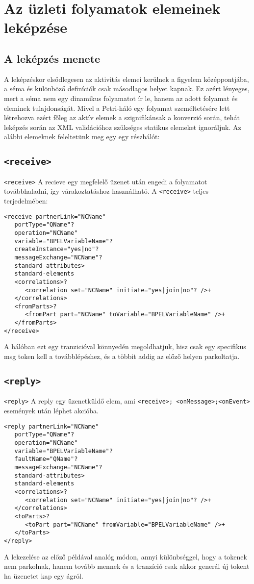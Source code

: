 \chapter{Az üzleti folyamatok elemeinek leképzése}


\section{A leképzés menete}
A leképzéskor elsődlegesen az aktivitás elemei kerülnek a figyelem középpontjába, a séma és különböző definíciók csak másodlagos helyet kapnak. Ez azért lényeges, mert a séma nem egy dinamikus folyamatot ír le, hanem az adott folyamat és eleminek tulajdonságát. Mivel a Petri-háló egy folyamat személtetésére lett létrehozva ezért főleg az aktív elemek a szignifikánsak a konverzió során, tehát leképzés során az XML validációhoz szükséges statikus elemeket ignoráljuk.  Az alábbi elemeknek feleltetünk meg egy egy részhálót:
\section{\texttt{<receive>}}
\texttt{<receive>} A recieve egy megfelelő üzenet után engedi a folyamatot továbbhaladni, így várakoztatáshoz használható. A \texttt{<receive>} teljes terjedelmében:\\
\begin{verbatim}
<receive partnerLink="NCName"
   portType="QName"?
   operation="NCName"
   variable="BPELVariableName"?
   createInstance="yes|no"?
   messageExchange="NCName"?
   standard-attributes>
   standard-elements
   <correlations>?
      <correlation set="NCName" initiate="yes|join|no"? />+
   </correlations>
   <fromParts>?
      <fromPart part="NCName" toVariable="BPELVariableName" />+
   </fromParts>
</receive>
\end{verbatim}
A hálóban ezt egy tranzicióval könnyedén megoldhatjuk, hisz csak egy specifikus msg token kell a továbblépéshez, és a többit addig az előző helyen parkoltatja. 

\section{\texttt{<reply>}}
\texttt{<reply>} A reply egy üzenetküldő elem, ami \texttt{<receive>; <onMessage>;<onEvent>} események után léphet akcióba. 
\begin{verbatim}
<reply partnerLink="NCName"
   portType="QName"?
   operation="NCName"
   variable="BPELVariableName"?
   faultName="QName"?
   messageExchange="NCName"?
   standard-attributes>
   standard-elements
   <correlations>?
      <correlation set="NCName" initiate="yes|join|no"? />+
   </correlations>
   <toParts>?
      <toPart part="NCName" fromVariable="BPELVariableName" />+
   </toParts>
</reply>
\end{verbatim}
A lekezelése az előző példával analóg módon, annyi különbséggel, hogy a tokenek nem parkolnak, hanem tovább mennek és a tranzíció csak akkor generál új tokent ha üzenetet kap egy ágról.

